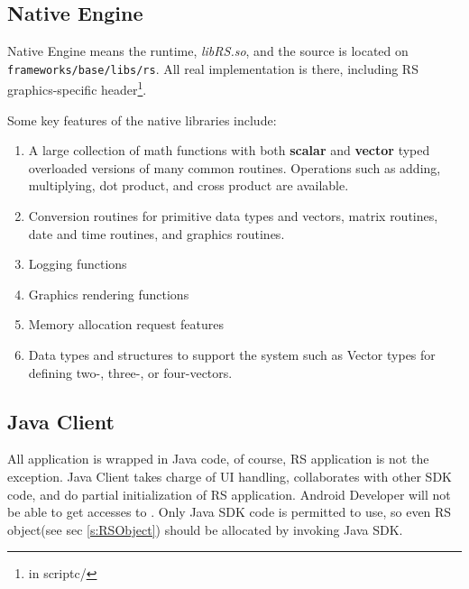 \subsection{Native Engine}
\label{ss:NativeEngine}

Native Engine means the \RS{} runtime, \textit{libRS.so}, and the source is located on \verb|frameworks/base/libs/rs|. All real \RS{} implementation is there, including RS graphics-specific header\footnote{in scriptc/}.

Some key features of the native \RS{} libraries include:
\begin{enumerate}
\item A large collection of math functions with both \textbf{scalar} and \textbf{vector} typed overloaded versions of many common routines. Operations such as adding, multiplying, dot product, and cross product are available.
\item Conversion routines for primitive data types and vectors, matrix routines, date and time routines, and graphics routines.
\item Logging functions
\item Graphics rendering functions
\item Memory allocation request features
\item Data types and structures to support the \RS{} system such as Vector types for defining two-, three-, or four-vectors.
\end{enumerate}

\subsection{Java Client}
\label{ss:JavaClient}
All application is wrapped in Java code, of course, RS application is not the exception. Java Client takes charge of UI handling, collaborates with other SDK code, and do partial initialization of RS application.
Android Developer will not be able to get accesses to \Core{}. Only Java SDK code is permitted to use, so even RS object(see sec \ref{s:RSObject}) should be allocated by invoking Java SDK.


